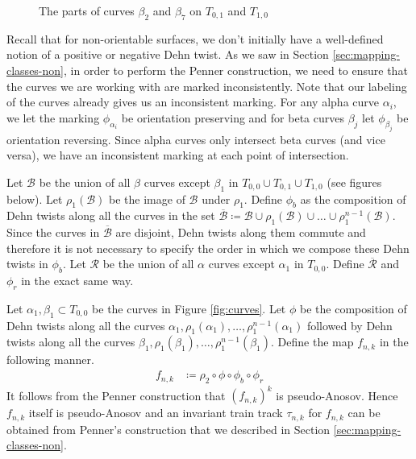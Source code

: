 \begin{figure}[h]
    \centering
    \caption{The parts of curves $\beta_2$ and $\beta_7$ on $T_{0,1}$ and $T_{1,0}$}
    \label{fig:extracurves}
\end{figure}

Recall that for non-orientable surfaces, we don't initially have a well-defined notion of a positive or
negative Dehn twist. As we saw in Section \ref{sec:mapping-classes-non}, in order to perform the Penner
construction, we need to ensure that the curves we are working with are marked inconsistently. Note that our
labeling of the curves already gives us an inconsistent marking. For any alpha curve $\alpha_i$, we let the
marking $\phi_{\alpha_i}$ be orientation preserving and for beta curves $\beta_j$ let $\phi_{\beta_j}$ be
orientation reversing. Since alpha curves only intersect beta curves (and vice versa), we have an inconsistent
marking at each point of intersection.

Let $\mathcal{B}$ be the union of all $\beta$ curves except $\beta_1$ in $T_{0,0} \cup T_{0,1} \cup T_{1,0}$
(see figures below). Let $\rho_1(\mathcal{B})$ be the image of $\mathcal{B}$ under $\rho_1$. Define $\phi_b$
as the composition of Dehn twists along all the curves in the set
$\overline{\mathcal{B}} \coloneqq \mathcal{B} \cup \rho_1(\mathcal{B}) \cup \dots \cup
\rho_1^{n-1}(\mathcal{B})$. Since the curves in $\overline{\mathcal{B}}$ are disjoint, Dehn twists along them
commute and therefore it is not necessary to specify the order in which we compose these Dehn twists in
$\phi_b$. Let $\mathcal{R}$ be the union of all $\alpha$ curves except $\alpha_1$ in $T_{0,0}$. Define
$\overline{\mathcal{R}}$ and $\phi_r$ in the exact same way.

Let $\alpha_1,\beta_1 \subset T_{0,0}$ be the curves in Figure \ref{fig:curves}. Let $\phi$ be the composition
of Dehn twists along all the curves $\alpha_1, \rho_1(\alpha_1), \dots, \rho_1^{n-1}(\alpha_1)$ followed by
Dehn twists along all the curves $\beta_1,\rho_1(\beta_1),\dots,\rho_1^{n-1}(\beta_1)$. Define the map $f_{n,k}$
in the following manner.
\begin{align*}
    f_{n,k} &\coloneqq \rho_2 \circ \phi \circ \phi_b \circ \phi_r
\end{align*}
It follows from the Penner construction that $(f_{n,k})^k$ is pseudo-Anosov. Hence $f_{n,k}$ itself is
pseudo-Anosov and an invariant train track $\tau_{n,k}$ for $f_{n,k}$ can be obtained from Penner's
construction that we described in Section \ref{sec:mapping-classes-non}.

